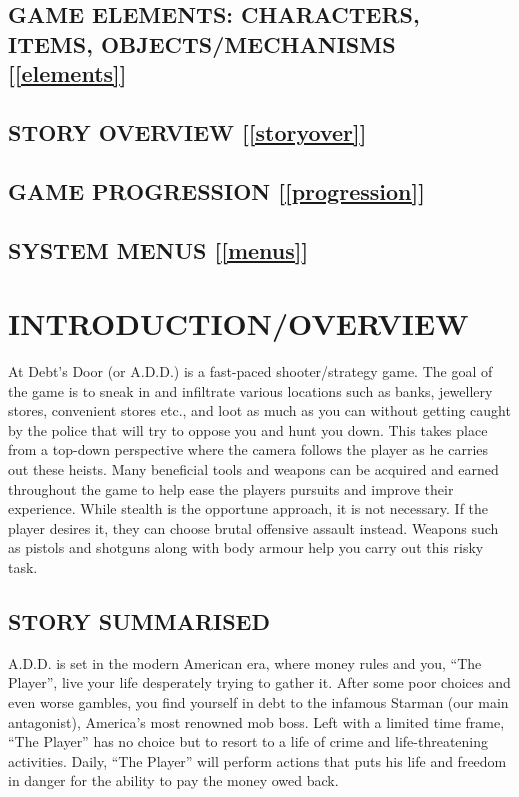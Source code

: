 \documentclass{article}
\begin{document}
\subsection{GAME ELEMENTS: CHARACTERS, ITEMS, OBJECTS/MECHANISMS [\ref{elements}]}

%

\subsection{STORY OVERVIEW [\ref{storyover}]}

%

\subsection{GAME PROGRESSION [\ref{progression}]}

%

\subsection{SYSTEM MENUS [\ref{menus}]}


\section{INTRODUCTION/OVERVIEW \label{intro}}
At Debt's Door (or A.D.D.) is a fast-paced shooter/strategy game. The goal of the game is to sneak in and infiltrate various locations such as banks, jewellery stores, convenient stores etc., and loot as much as you can without getting caught by the police that will try to oppose you and hunt you down. This takes place from a top-down perspective where the camera follows the player as he carries out these heists. Many beneficial tools and weapons can be acquired and earned throughout the game to help ease the players pursuits and improve their experience.
\bigbreak
While stealth is the opportune approach, it is not necessary. If the player desires it, they can choose brutal offensive assault instead. Weapons such as pistols and shotguns along with body armour help you carry out this risky task.

\subsection{STORY SUMMARISED \label{storysumm}}
A.D.D. is set in the modern American era, where money rules and you, “The Player”, live your life desperately trying to gather it. After some poor choices and even worse gambles, you find yourself in debt to the infamous Starman (our main antagonist), America's most renowned mob boss. Left with a limited time frame, “The Player” has no choice but to resort to a life of crime and life-threatening activities. Daily, “The Player” will perform actions that puts his life and freedom in danger for the ability to pay the money owed back.
\end{document}
